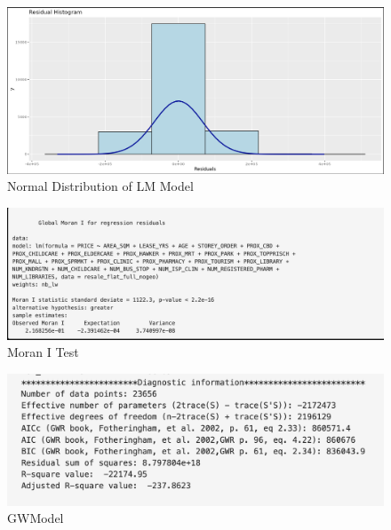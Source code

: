\documentclass[manuscript,screen]{acmart}
\begin{document}
\begin{figure}

{\centering \includegraphics{images/Screenshot 2023-04-15 at 11.02.51 PM.png}

}

\caption{\label{fig-12}Normal Distribution of LM Model}

\end{figure}

\begin{figure}

{\centering \includegraphics{images/Screenshot 2023-04-15 at 11.00.00 PM-01.png}

}

\caption{\label{fig-13}Moran I Test}

\end{figure}

\begin{figure}

{\centering \includegraphics{images/Screenshot 2023-04-15 at 11.27.38 PM.png}

}

\caption{\label{fig-14}GWModel}

\end{figure}





\end{document}
